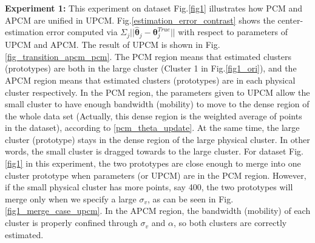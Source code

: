 \documentclass[journal,transmag]{IEEEtran}
\begin{document}
\textbf{Experiment 1:} This experiment on dataset Fig.\ref{fig1} illustrates how PCM and APCM are unified in UPCM.
Fig.\ref{estimation_error_contrast} shows the center-estimation error computed via $\Sigma_j||\hat{\boldsymbol{\theta}}_j-\boldsymbol{\theta}_j^{True}||$ with respect to parameters of UPCM and APCM.
The result of UPCM is shown in Fig.\ref{fig_transition_apcm_pcm}. The PCM region means that estimated clusters (prototypes) are both in the large cluster (Cluster 1 in Fig.\ref{fig1_ori}), and the APCM region means that estimated clusters (prototypes) are in each physical cluster respectively.
In the PCM region, the parameters given to UPCM allow the small cluster to have enough bandwidth (mobility) to move to the dense region of the whole data set (Actually, this dense region is the weighted average of points in the dataset), according to \eqref{pcm_theta_update}. At the same time, the large cluster (prototype) stays in the dense region of the large physical cluster. In other words, the small cluster is dragged towards to the large cluster. For dataset Fig.\ref{fig1} in this experiment, the two prototypes are close enough to merge into one cluster prototype when parameters (or UPCM) are in the PCM region. However, if the small physical cluster has more points, say 400, the two prototypes will merge only when we specify a large $\sigma_v$, as can be seen in Fig.\ref{fig1_merge_case_upcm}.
In the APCM region, the bandwidth (mobility) of each cluster is properly confined through $\sigma_v$ and $\alpha$, so both clusters are correctly estimated.
\end{document}
